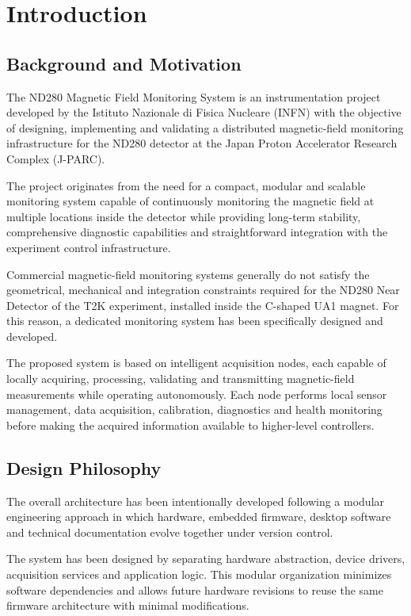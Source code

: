 \chapter{Introduction}

\section{Background and Motivation}

The ND280 Magnetic Field Monitoring System is an instrumentation project developed by the Istituto Nazionale di Fisica Nucleare (INFN) with the objective of designing, implementing and validating a distributed magnetic-field monitoring infrastructure for the ND280 detector at the Japan Proton Accelerator Research Complex (J-PARC).

The project originates from the need for a compact, modular and scalable monitoring system capable of continuously monitoring the magnetic field at multiple locations inside the detector while providing long-term stability, comprehensive diagnostic capabilities and straightforward integration with the experiment control infrastructure.

Commercial magnetic-field monitoring systems generally do not satisfy the geometrical, mechanical and integration constraints required for the ND280 Near Detector of the T2K experiment, installed inside the C-shaped UA1 magnet. For this reason, a dedicated monitoring system has been specifically designed and developed.

The proposed system is based on intelligent acquisition nodes, each capable of locally acquiring, processing, validating and transmitting magnetic-field measurements while operating autonomously. Each node performs local sensor management, data acquisition, calibration, diagnostics and health monitoring before making the acquired information available to higher-level controllers.

\section{Design Philosophy}

The overall architecture has been intentionally developed following a modular engineering approach in which hardware, embedded firmware, desktop software and technical documentation evolve together under version control.

The system has been designed by separating hardware abstraction, device drivers, acquisition services and application logic. This modular organization minimizes software dependencies and allows future hardware revisions to reuse the same firmware architecture with minimal modifications.

